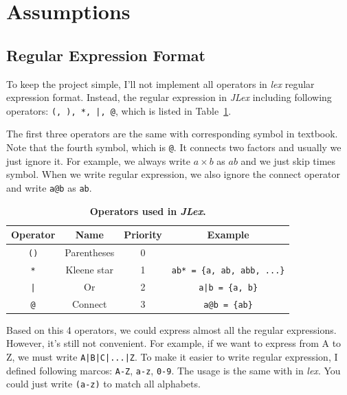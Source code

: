 \documentclass{article}
\begin{document}
\section{Assumptions}

\subsection{Regular Expression Format}

To keep the project simple, I'll not implement all operators in \textit{lex} regular expression format. Instead, the regular expression in \textit{JLex} including following operators: \texttt{(, ), *, |, @}, which is listed in Table~\ref{operator}.

The first three operators are the same with corresponding symbol in textbook. Note that the fourth symbol, which is \texttt{@}. It connects two factors and usually we just ignore it. For example, we always write $a\times b$ as $ab$ and we just skip times symbol. When we write regular expression, we also ignore the connect operator and write \texttt{a@b} as \texttt{ab}.

\begin{table}[htbp]
    \centering
    \begin{tabular}{cccc}
        \toprule
        \textbf{Operator} & \textbf{Name} & \textbf{Priority} & \textbf{Example}                   \\
        \midrule
        \texttt{()}       & Parentheses   & 0                 &                                    \\
        \texttt{*}        & Kleene star   & 1                 & \texttt{ab* = \{a, ab, abb, ...\}} \\
        \texttt{|}        & Or            & 2                 & \texttt{a|b = \{a, b\}}            \\
        \texttt{@}        & Connect       & 3                 & \texttt{a@b = \{ab\}}              \\
        \bottomrule
    \end{tabular}%
    \caption{\textbf{Operators used in \textit{JLex}.}}
    \label{operator}%
\end{table}%

Based on this 4 operators, we could express almost all the regular expressions. However, it's still not convenient. For example, if we want to express from A to Z, we must write \texttt{A|B|C|...|Z}. To make it easier to write regular expression, I defined following marcos: \texttt{A-Z}, \texttt{a-z}, \texttt{0-9}. The usage is the same with in \textit{lex}. You could just write \texttt{(a-z)} to match all alphabets.
\end{document}
